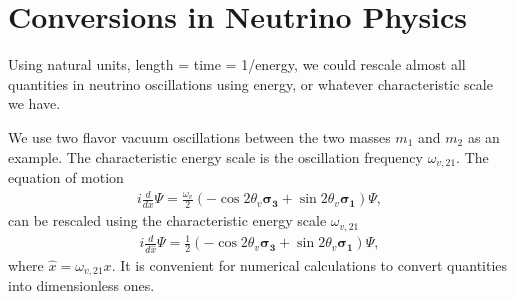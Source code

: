 \section{Conversions in Neutrino Physics}

Using natural units, length = time = 1/energy, we could rescale almost all quantities in neutrino oscillations using energy, or whatever characteristic scale we have.

We use two flavor vacuum oscillations between the two masses $m_1$ and $m_2$ as an example. The characteristic energy scale is the oscillation frequency $\omega_{v,21}$. The equation of motion
\begin{align}
   i\frac{d}{d x} \Psi = \frac{\omega_v}{2}(-\cos 2\theta_v \boldsymbol{\sigma_3} + \sin 2\theta_v \boldsymbol{\sigma_1}) \Psi,
\end{align}
can be rescaled using the characteristic energy scale $\omega_{v,21}$
\begin{align}
   i\frac{d}{d \hat x} \Psi = \frac{1}{2}(-\cos 2\theta_v \boldsymbol{\sigma_3} + \sin 2\theta_v \boldsymbol{\sigma_1})\Psi ,
\end{align}
where $\hat x = \omega_{v,21} x$. It is convenient for numerical calculations to convert quantities into dimensionless ones.

